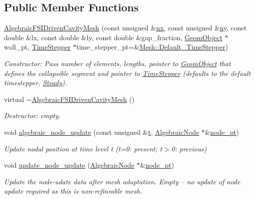 \subsection*{Public Member Functions}
\begin{DoxyCompactItemize}
\item 
\hyperlink{classoomph_1_1AlgebraicFSIDrivenCavityMesh_a973ccadc769d98fed6bc9dd4eff32083}{Algebraic\+F\+S\+I\+Driven\+Cavity\+Mesh} (const unsigned \&\hyperlink{classoomph_1_1SimpleRectangularQuadMesh_a4ff7678ec433180e2245ea2147f222b7}{nx}, const unsigned \&\hyperlink{classoomph_1_1SimpleRectangularQuadMesh_a45011f22dedd480392b1f376e4269921}{ny}, const double \&lx, const double \&ly, const double \&gap\+\_\+fraction, \hyperlink{classoomph_1_1GeomObject}{Geom\+Object} $\ast$wall\+\_\+pt, \hyperlink{classoomph_1_1TimeStepper}{Time\+Stepper} $\ast$time\+\_\+stepper\+\_\+pt=\&\hyperlink{classoomph_1_1Mesh_a12243d0fee2b1fcee729ee5a4777ea10}{Mesh\+::\+Default\+\_\+\+Time\+Stepper})
\begin{DoxyCompactList}\small\item\em Constructor\+: Pass number of elements, lengths, pointer to \hyperlink{classoomph_1_1GeomObject}{Geom\+Object} that defines the collapsible segment and pointer to \hyperlink{classoomph_1_1TimeStepper}{Time\+Stepper} (defaults to the default timestepper, \hyperlink{classoomph_1_1Steady}{Steady}). \end{DoxyCompactList}\item 
virtual \hyperlink{classoomph_1_1AlgebraicFSIDrivenCavityMesh_a048a142aff0ca5fd62273f756bce4ab6}{$\sim$\+Algebraic\+F\+S\+I\+Driven\+Cavity\+Mesh} ()
\begin{DoxyCompactList}\small\item\em Destructor\+: empty. \end{DoxyCompactList}\item 
void \hyperlink{classoomph_1_1AlgebraicFSIDrivenCavityMesh_a56c72b78935e84f7fef3f6b5d85556c3}{algebraic\+\_\+node\+\_\+update} (const unsigned \&\hyperlink{cfortran_8h_af6f0bd3dc13317f895c91323c25c2b8f}{t}, \hyperlink{classoomph_1_1AlgebraicNode}{Algebraic\+Node} $\ast$\&\hyperlink{classoomph_1_1AlgebraicMesh_aedeebbe95d2f8e67e9939cecd1be3933}{node\+\_\+pt})
\begin{DoxyCompactList}\small\item\em Update nodal position at time level t (t=0\+: present; t$>$0\+: previous) \end{DoxyCompactList}\item 
void \hyperlink{classoomph_1_1AlgebraicFSIDrivenCavityMesh_a87d34d6cf84c62a9049773451c664176}{update\+\_\+node\+\_\+update} (\hyperlink{classoomph_1_1AlgebraicNode}{Algebraic\+Node} $\ast$\&\hyperlink{classoomph_1_1AlgebraicMesh_aedeebbe95d2f8e67e9939cecd1be3933}{node\+\_\+pt})
\begin{DoxyCompactList}\small\item\em Update the node-\/udate data after mesh adaptation. Empty -- no update of node update required as this is non-\/refineable mesh. \end{DoxyCompactList}\end{DoxyCompactItemize}
